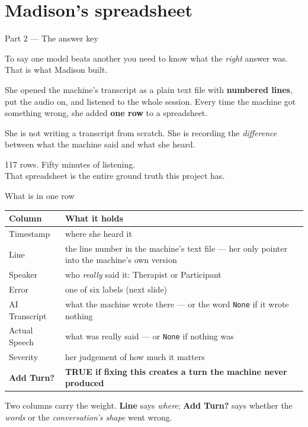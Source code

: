 \documentclass[aspectratio=169]{beamer}
\newcommand{\keybox}[1]{%
  \par\vspace{4pt}\begingroup\centering
  \colorbox{warmbg}{\parbox{0.93\textwidth}{\centering #1}}%
  \par\endgroup\vspace{2pt}}
\newcommand{\bigidea}[1]{%
  \vfill
  \begingroup\centering
  \colorbox{warmbg}{\parbox{0.93\textwidth}{\centering \large #1}}%
  \par\endgroup
  \vfill}
\newenvironment{nicetable}[1]
  {\par\vspace{2pt}\begingroup\centering\small
   \renewcommand{\arraystretch}{1.18}%
   \setlength{\tabcolsep}{6pt}\rowcolors{2}{band}{white}%
   \begin{tabular}{#1}\arrayrulecolor{hdr}\toprule}
  {\bottomrule\end{tabular}\par\endgroup\vspace{2pt}}
\newcommand{\hd}[1]{\textcolor{hdr}{\textbf{#1}}}
\begin{document}
\section{Madison's spreadsheet}
\begin{frame}{Part 2 --- The answer key}

To say one model beats another you need to know what the \emph{right} answer was. That is
what Madison built.

\vspace{0.5em}
She opened the machine's transcript as a plain text file with \textbf{numbered lines}, put
the audio on, and listened to the whole session. Every time the machine got something wrong,
she added \textbf{one row} to a spreadsheet.

\vspace{0.5em}
She is not writing a transcript from scratch. She is recording the \emph{difference} between
what the machine said and what she heard.

\bigidea{117 rows. Fifty minutes of listening.\\[3pt]
That spreadsheet is the entire ground truth this project has.}

\end{frame}

\begin{frame}{What is in one row}

\begin{nicetable}{p{2.9cm}p{9.6cm}}
\hd{Column} & \hd{What it holds} \\ \midrule
Timestamp     & where she heard it \\
Line          & the line number in the machine's text file --- her only pointer into the machine's own version \\
Speaker       & who \emph{really} said it: Therapist or Participant \\
Error         & one of six labels (next slide) \\
AI Transcript & what the machine wrote there --- or the word \texttt{None} if it wrote nothing \\
Actual Speech & what was really said --- or \texttt{None} if nothing was \\
Severity      & her judgement of how much it matters \\
\textbf{Add Turn?} & \textbf{TRUE if fixing this creates a turn the machine never produced} \\
\end{nicetable}

\keybox{Two columns carry the weight. \textbf{Line} says \emph{where}; \textbf{Add Turn?}
says whether the \emph{words} or the \emph{conversation's shape} went wrong.}

\end{frame}
\end{document}
